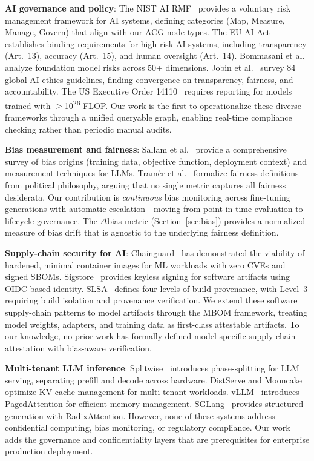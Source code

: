 \documentclass[conference,10pt]{IEEEtran}
\begin{document}
\textbf{AI governance and policy}: The NIST AI RMF~\cite{nistai2024} provides a voluntary risk management framework for AI systems, defining categories (Map, Measure, Manage, Govern) that align with our ACG node types. The EU AI Act~\cite{euaiact2025} establishes binding requirements for high-risk AI systems, including transparency (Art.~13), accuracy (Art.~15), and human oversight (Art.~14). Bommasani et al.~\cite{bommasani2024foundation} analyze foundation model risks across 50+ dimensions. Jobin et al.~\cite{jobin2023ai} survey 84 global AI ethics guidelines, finding convergence on transparency, fairness, and accountability. The US Executive Order 14110~\cite{whitehouse2023aibo} requires reporting for models trained with $>$10\textsuperscript{26} FLOP. Our work is the first to operationalize these diverse frameworks through a unified queryable graph, enabling real-time compliance checking rather than periodic manual audits.

\textbf{Bias measurement and fairness}: Sallam et al.~\cite{sallam2024bias} provide a comprehensive survey of bias origins (training data, objective function, deployment context) and measurement techniques for LLMs. Tram\`{e}r et al.~\cite{tramer2023fairness} formalize fairness definitions from political philosophy, arguing that no single metric captures all fairness desiderata. Our contribution is \emph{continuous} bias monitoring across fine-tuning generations with automatic escalation---moving from point-in-time evaluation to lifecycle governance. The $\Delta$bias metric (Section~\ref{sec:bias}) provides a normalized measure of bias drift that is agnostic to the underlying fairness definition.

\textbf{Supply-chain security for AI}: Chainguard~\cite{chainguard2025ai} has demonstrated the viability of hardened, minimal container images for ML workloads with zero CVEs and signed SBOMs. Sigstore~\cite{sigstore2024} provides keyless signing for software artifacts using OIDC-based identity. SLSA~\cite{slsa2024} defines four levels of build provenance, with Level~3 requiring build isolation and provenance verification. We extend these software supply-chain patterns to model artifacts through the MBOM framework, treating model weights, adapters, and training data as first-class attestable artifacts. To our knowledge, no prior work has formally defined model-specific supply-chain attestation with bias-aware verification.

\textbf{Multi-tenant LLM inference}: Splitwise~\cite{patel2024splitwise} introduces phase-splitting for LLM serving, separating prefill and decode across hardware. DistServe and Mooncake~\cite{qin2025mooncake} optimize KV-cache management for multi-tenant workloads. vLLM~\cite{kwon2023vllm} introduces PagedAttention for efficient memory management. SGLang~\cite{zheng2024sglang} provides structured generation with RadixAttention. However, none of these systems address confidential computing, bias monitoring, or regulatory compliance. Our work adds the governance and confidentiality layers that are prerequisites for enterprise production deployment.
\end{document}
